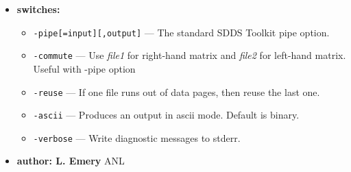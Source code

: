 \begin{itemize}
\item {\bf switches:}
%
%
    \begin{itemize}
    \item {\tt  -pipe[=input][,output]} --- The standard SDDS Toolkit pipe option.
    \item {\tt  -commute} --- Use {\em file1} for right-hand matrix and 
      {\em file2} for 
      left-hand matrix.  Useful with -pipe option
    \item {\tt  -reuse} --- If one file runs out of data pages, 
         then reuse the last one.
    \item {\tt  -ascii}  --- Produces an output in ascii mode. Default is binary.
    \item {\tt  -verbose} --- Write diagnostic messages to stderr.
    \end{itemize}
%
%
%
%
\item {\bf author: L. Emery } ANL
\end{itemize}



